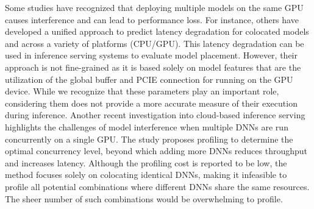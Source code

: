 Some studies have recognized that deploying multiple models on the same GPU causes interference and can lead to performance loss. For instance, others have developed a unified approach to predict latency degradation for colocated models and across a variety of platforms (CPU/GPU). This latency degradation can be used in inference serving systems to evaluate model placement. However, their approach is not fine-grained as it is based solely on model features that are the utilization of the global buffer and PCIE connection for running on the GPU device. While we recognize that these parameters play an important role, considering them does not provide a more accurate measure of their execution during inference.
Another recent investigation into cloud-based inference serving highlights the challenges of model interference when multiple DNNs are run concurrently on a single GPU. The study proposes profiling to determine the optimal concurrency level, beyond which adding more DNNs reduces throughput and increases latency. Although the profiling cost is reported to be low, the method focuses solely on colocating identical DNNs, making it infeasible to profile all potential combinations where different DNNs share the same resources. The sheer number of such combinations would be overwhelming to profile.



